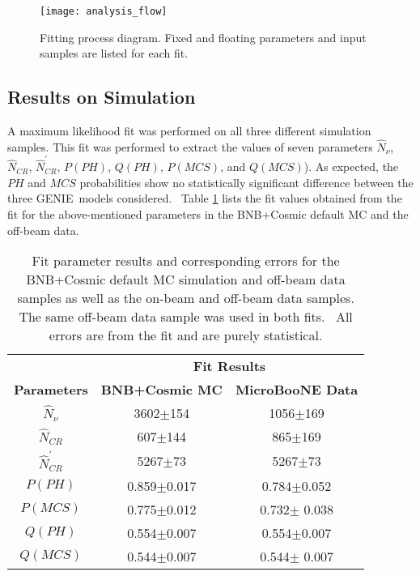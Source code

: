 \documentclass{article}
\begin{document}
\begin{figure}[tbp]
\centering
\texttt{[image: analysis\_flow]} 
\caption{Fitting process diagram.  Fixed and floating parameters and input samples are listed for each fit. }
\label{img:fit_workflow}
\end{figure}

\subsection{Results on Simulation}

A maximum likelihood fit was performed on all three different simulation
samples. This fit was performed to extract the values of seven parameters $%
\hat{N}_{\nu }$, $\hat{N}_{CR}$, $\hat{N}_{CR}^{\prime }$, $P(PH)$, $Q(PH)$, $%
P(MCS)$, and $Q(MCS)$). As expected, the $PH$ and $MCS$ probabilities show
no statistically significant difference between the three GENIE\ models
considered. \ Table \ref{tab:fit_values_BNB+Cosmic_data} lists the fit
values obtained from the fit for the above-mentioned parameters in the
BNB+Cosmic default MC and the off-beam data.

\begin{table}[ptb]
\caption{Fit parameter results and corresponding errors for the BNB+Cosmic default MC simulation and off-beam data samples as well as the on-beam and off-beam data samples.  The same off-beam data sample was used in both fits. \ All errors are from the fit and are purely
statistical.}
\label{tab:fit_values_BNB+Cosmic_data}
\begin{center}
\begin{tabular}{c|c|c}
& \multicolumn{2}{c}{\textbf{Fit Results}} \\ 
\textbf{Parameters} & \textbf{BNB+Cosmic MC} & \textbf{MicroBooNE Data} \\ \hline
$\hat{N}_{\nu}$ & 3602$\pm$154 & 1056$\pm$169 \\ 
$\hat{N}_{CR}$ & 607$\pm$144 & 865$\pm$169 \\ 
$\hat{N}_{CR}^{\prime}$ & 5267$\pm$73 & 5267$\pm$73 \\ 
$P(PH)$ & 0.859$\pm$0.017 & 0.784$\pm$0.052 \\ 
$P(MCS)$ & 0.775$\pm$0.012 & 0.732$\pm$ 0.038 \\ 
$Q(PH)$ & 0.554$\pm$0.007 & 0.554$\pm$0.007 \\ 
$Q(MCS)$ & 0.544$\pm$0.007 & 0.544$\pm$ 0.007 \\ 

\end{tabular}
\end{center}
\end{table}
\end{document}
